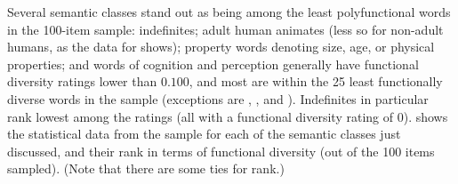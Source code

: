 Several semantic classes stand out as being among the least polyfunctional words in the 100-item  sample: indefinites; adult human animates (less so for non-adult humans, as the data for  shows); property words denoting size, age, or physical properties; and words of cognition and perception generally have functional diversity ratings lower than $0.100$, and most are within the 25 least functionally diverse words in the sample (exceptions are , , and ). Indefinites in particular rank lowest among the ratings (all with a functional diversity rating of $0$).  shows the statistical data from the sample for each of the semantic classes just discussed, and their rank in terms of functional diversity (out of the 100 items sampled). (Note that there are some ties for rank.)

